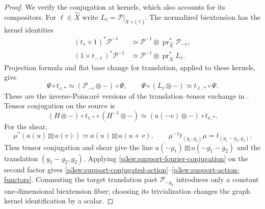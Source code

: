 \documentclass[11pt]{article}
\numberwithin{equation}{section}
\begin{document}
\begin{proof}
We verify the conjugation at kernels, which also accounts for its
compositors.  For \(\ell\in\widehat X\) write
\(L_\ell=\mathcal P|_{X\times\{\ell\}}\).
The normalized biextension has the kernel identities
\begin{equation}
 \begin{split}
 (t_v\times1)^*\mathcal P^{-1}
   &\simeq\mathcal P^{-1}\otimes
                    \operatorname{pr}_{\widehat X}^*\mathcal P_{-v},\\
 (1\times t_{-\ell})^*\mathcal P^{-1}
   &\simeq\mathcal P^{-1}\otimes\operatorname{pr}_X^*L_\ell .
 \end{split}
 \label{p3sw:support-poincare-kernel-identities}
\end{equation}
Projection formula and flat base change for translation, applied
to these kernels, give
\begin{equation}
 \Psi\circ t_{v,*}\simeq(\mathcal P_{-v}\otimes-)\circ\Psi,
 \qquad
 \Psi\circ(L_\ell\otimes-)\simeq t_{\ell,*}\circ\Psi.
 \label{p3sw:support-fourier-conjugation}
\end{equation}
These are the inverse-Poincar\'e versions of the translation--tensor
exchange in \cite[Section 3, (3.1)]{P3SWMukai1981}.
Tensor conjugation on the source is
\begin{equation}
 (H\otimes-)\circ t_{v,*}\circ(H^{-1}\otimes-)
 \simeq(a(-v)\otimes-)\circ t_{v,*}.
 \label{p3sw:support-tensor-conjugation}
\end{equation}
For the shear,
\begin{equation}
 \mu^*(a(u)\boxtimes a(v))
       \simeq a(u)\boxtimes a(u+v),\qquad
 \mu^{-1}t_{(g_1,g_2)}\mu=t_{(g_1-g_2,g_2)}.
 \label{p3sw:support-shear-conjugation}
\end{equation}
Thus tensor conjugation and shear give the line
\(a(-g_1)\boxtimes a(-g_1-g_2)\) and the translation
\((g_1-g_2,g_2)\).  Applying \eqref{p3sw:support-fourier-conjugation} on the second factor gives
\eqref{p3sw:support-conjugated-action}--\eqref{p3sw:support-action-functors}.  Commuting the target translation past
\(\mathcal P_{-g_2}\) introduces only a constant one-dimensional
biextension fiber; choosing its trivialization changes the graph
kernel identification by a scalar.


\end{proof}
\end{document}
